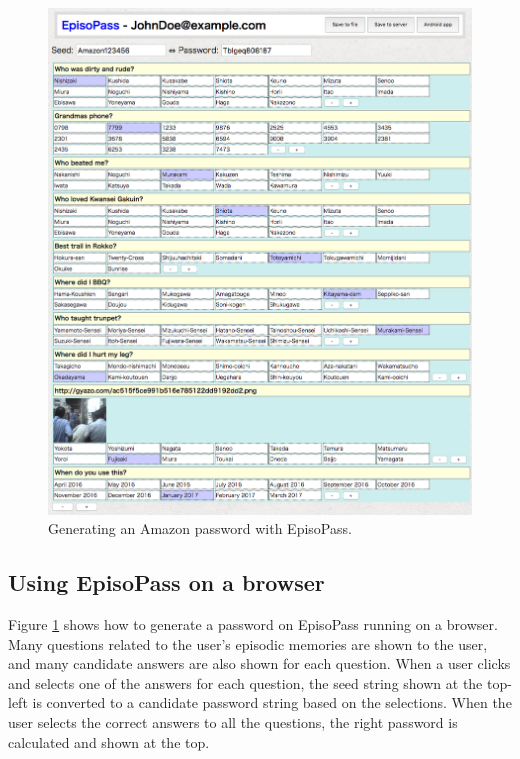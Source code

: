 \documentclass[runningheads,a4paper]{llncs}
\begin{document}
\begin{figure}[H]
\centering
\includegraphics[width=1.0\columnwidth]{figures/4d13e6804ba790624c1f8e2b8255bde5}
\caption{Generating an Amazon password with EpisoPass.}
\label{web1}
\end{figure}

\subsection{Using EpisoPass on a browser}

Figure \ref{web1} shows how to generate a password
on EpisoPass running on a browser.
Many questions related to the user's episodic memories are shown to the user,
and many candidate answers are also shown for each question.
When a user clicks and selects one of the answers for each question,
the seed string shown at the top-left is converted to a
candidate password string based on the selections.
When the user selects the correct answers to all the questions,
the right password is calculated and shown at the top.
\end{document}
